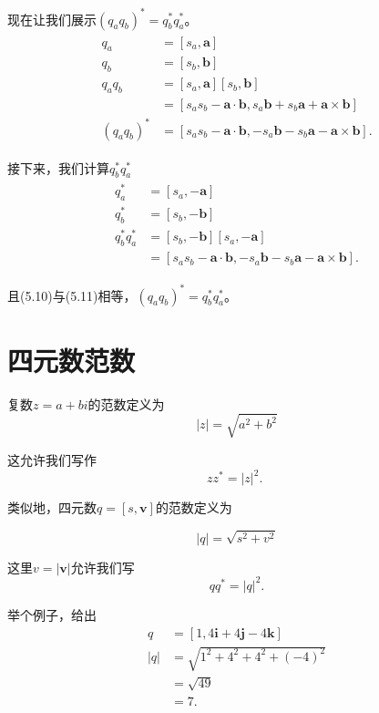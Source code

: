 现在让我们展示$\left(q_{a} q_{b}\right)^{*}=q_{b}^{*} q_{a}^{*}$。
\begin{align}
    \begin{aligned}
        q_{a} & =\left[s_{a}, \mathbf{a}\right] \\
        q_{b} & =\left[s_{b}, \mathbf{b}\right] \\
        q_{a} q_{b} & =\left[s_{a}, \mathbf{a}\right]\left[s_{b}, \mathbf{b}\right] \\
        & =\left[s_{a} s_{b}-\mathbf{a} \cdot \mathbf{b}, s_{a} \mathbf{b}+s_{b} \mathbf{a}+\mathbf{a} \times \mathbf{b}\right] \\
        \left(q_{a} q_{b}\right)^{*} & =\left[s_{a} s_{b}-\mathbf{a} \cdot \mathbf{b},-s_{a} \mathbf{b}-s_{b} \mathbf{a}-\mathbf{a} \times \mathbf{b}\right] .
    \end{aligned}
\end{align}

接下来，我们计算$q_{b}^{*} q_{a}^{*}$
\begin{align}
    \begin{aligned}
        q_{a}^{*} & =\left[s_{a},-\mathbf{a}\right] \\
        q_{b}^{*} & =\left[s_{b},-\mathbf{b}\right] \\
        q_{b}^{*} q_{a}^{*} & =\left[s_{b},-\mathbf{b}\right]\left[s_{a},-\mathbf{a}\right] \\
        & =\left[s_{a} s_{b}-\mathbf{a} \cdot \mathbf{b},-s_{a} \mathbf{b}-s_{b} \mathbf{a}-\mathbf{a} \times \mathbf{b}\right] .
    \end{aligned}
\end{align}

且(5.10)与(5.11)相等，$\left(q_{a} q_{b}\right)^{*}=q_{b}^{*} q_{a}^{*}$。

\section{四元数范数}
复数$z=a+ bi $的范数定义为
$$
|z|=\sqrt{a^{2}+b^{2}}
$$

这允许我们写作
$$
z z^{*}=|z|^{2} \text {. }
$$

类似地，四元数$q=[s, \mathbf{v}]$的范数定义为

$$
|q|=\sqrt{s^{2}+v^{2}}
$$

这里$v=|\mathbf{v}|$允许我们写
$$
q q^{*}=|q|^{2} .
$$

举个例子，给出
$$
\begin{aligned}
q & =[1,4 \mathbf{i}+4 \mathbf{j}-4 \mathbf{k}] \\
|q| & =\sqrt{1^{2}+4^{2}+4^{2}+(-4)^{2}} \\
& =\sqrt{49} \\
& =7 .
\end{aligned}
$$

